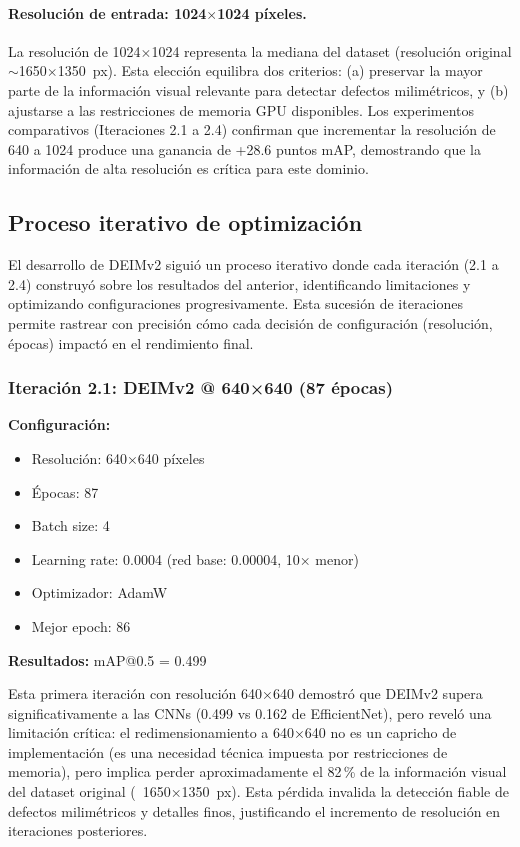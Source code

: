 \paragraph{Resolución de entrada: 1024$\times$1024 píxeles.}
La resolución de 1024$\times$1024 representa la mediana del dataset (resolución original $\sim$1650$\times$1350~px). Esta elección equilibra dos criterios: (a) preservar la mayor parte de la información visual relevante para detectar defectos milimétricos, y (b) ajustarse a las restricciones de memoria GPU disponibles. Los experimentos comparativos (Iteraciones 2.1 a 2.4) confirman que incrementar la resolución de 640 a 1024 produce una ganancia de +28.6 puntos mAP, demostrando que la información de alta resolución es crítica para este dominio.

\subsection{Proceso iterativo de optimización}

El desarrollo de DEIMv2 siguió un proceso iterativo donde cada iteración (2.1 a 2.4) construyó sobre los resultados del anterior, identificando limitaciones y optimizando configuraciones progresivamente. Esta sucesión de iteraciones permite rastrear con precisión cómo cada decisión de configuración (resolución, épocas) impactó en el rendimiento final.

\subsubsection{Iteración 2.1: DEIMv2 @ 640×640 (87 épocas)}

\textbf{Configuración:}
\begin{itemize}
    \item Resolución: 640×640 píxeles
    \item Épocas: 87
    \item Batch size: 4
    \item Learning rate: 0.0004 (red base: 0.00004, 10× menor)
    \item Optimizador: AdamW
    \item Mejor epoch: 86
\end{itemize}

\textbf{Resultados:} mAP@0.5 = 0.499

Esta primera iteración con resolución 640×640 demostró que DEIMv2 supera significativamente a las CNNs (0.499 vs 0.162 de EfficientNet), pero reveló una limitación crítica: el redimensionamiento a 640×640 no es un capricho de implementación (es una necesidad técnica impuesta por restricciones de memoria), pero implica perder aproximadamente el 82\,\% de la información visual del dataset original (~1650×1350~px). Esta pérdida invalida la detección fiable de defectos milimétricos y detalles finos, justificando el incremento de resolución en iteraciones posteriores.


